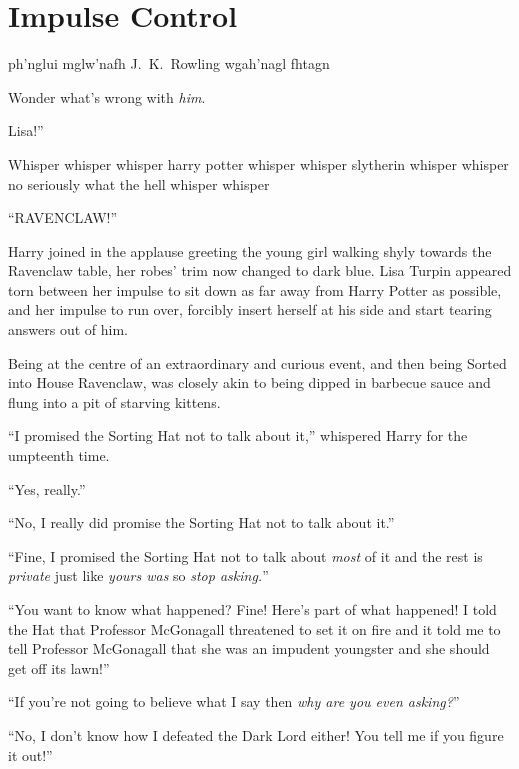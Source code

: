 \chapter{Impulse Control}

\begin{chapterOpeningAuthorNote}
ph'nglui mglw'nafh J.~K.~Rowling wgah'nagl fhtagn
\end{chapterOpeningAuthorNote}
\begin{chapterOpeningQuote}
Wonder what's wrong with \emph{him}.
\end{chapterOpeningQuote}

 Lisa!”

\hplettrineextrapara
Whisper whisper whisper harry potter whisper whisper slytherin whisper whisper no seriously what the hell whisper whisper

“RAVENCLAW!”

Harry joined in the applause greeting the young girl walking shyly towards the Ravenclaw table, her robes’ trim now changed to dark blue. Lisa Turpin appeared torn between her impulse to sit down as far away from Harry Potter as possible, and her impulse to run over, forcibly insert herself at his side and start tearing answers out of him.

Being at the centre of an extraordinary and curious event, and then being Sorted into House Ravenclaw, was closely akin to being dipped in barbecue sauce and flung into a pit of starving kittens.

“I promised the Sorting Hat not to talk about it,” whispered Harry for the umpteenth time.

“Yes, really.”

“No, I really did promise the Sorting Hat not to talk about it.”

“Fine, I promised the Sorting Hat not to talk about \emph{most} of it and the rest is \emph{private} just like \emph{yours was} so \emph{stop asking.}”

“You want to know what happened? Fine! Here’s part of what happened! I told the Hat that Professor McGonagall threatened to set it on fire and it told me to tell Professor McGonagall that she was an impudent youngster and she should get off its lawn!”

“If you’re not going to believe what I say then \emph{why are you even asking?}”

“No, I don’t know how I defeated the Dark Lord either! You tell me if you figure it out!”

